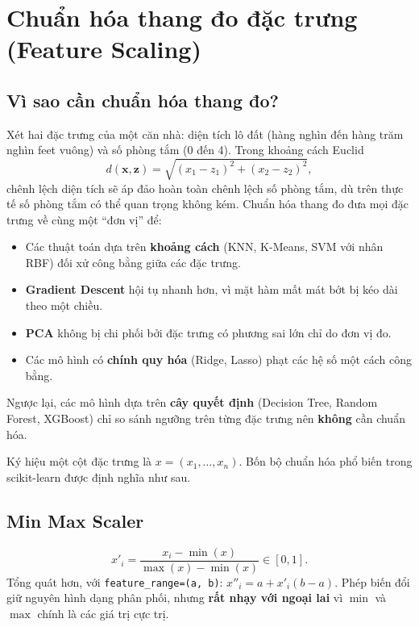 \section{Chuẩn hóa thang đo đặc trưng (Feature Scaling)}
\label{sec:scaling}

\subsection{Vì sao cần chuẩn hóa thang đo?}

Xét hai đặc trưng của một căn nhà: diện tích lô đất (hàng nghìn đến hàng trăm nghìn feet vuông) và số phòng tắm (0 đến 4). Trong khoảng cách Euclid
\begin{equation}
    d(\mathbf{x}, \mathbf{z}) = \sqrt{(x_1 - z_1)^2 + (x_2 - z_2)^2},
\end{equation}
chênh lệch diện tích sẽ áp đảo hoàn toàn chênh lệch số phòng tắm, dù trên thực tế số phòng tắm có thể quan trọng không kém. Chuẩn hóa thang đo đưa mọi đặc trưng về cùng một ``đơn vị'' để:
\begin{itemize}
    \item Các thuật toán dựa trên \textbf{khoảng cách} (KNN, K-Means, SVM với nhân RBF) đối xử công bằng giữa các đặc trưng.
    \item \textbf{Gradient Descent} hội tụ nhanh hơn, vì mặt hàm mất mát bớt bị kéo dài theo một chiều.
    \item \textbf{PCA} không bị chi phối bởi đặc trưng có phương sai lớn chỉ do đơn vị đo.
    \item Các mô hình có \textbf{chính quy hóa} (Ridge, Lasso) phạt các hệ số một cách công bằng.
\end{itemize}
Ngược lại, các mô hình dựa trên \textbf{cây quyết định} (Decision Tree, Random Forest, XGBoost) chỉ so sánh ngưỡng trên từng đặc trưng nên \textbf{không} cần chuẩn hóa.

Ký hiệu một cột đặc trưng là $x = (x_1, \dots, x_n)$. Bốn bộ chuẩn hóa phổ biến trong scikit-learn được định nghĩa như sau.

\subsection{Min Max Scaler}
\begin{equation}
    x'_i = \frac{x_i - \min(x)}{\max(x) - \min(x)} \in [0, 1].
\end{equation}
Tổng quát hơn, với \texttt{feature\_range=(a, b)}: $x''_i = a + x'_i (b - a)$. Phép biến đổi giữ nguyên hình dạng phân phối, nhưng \textbf{rất nhạy với ngoại lai} vì $\min$ và $\max$ chính là các giá trị cực trị.


